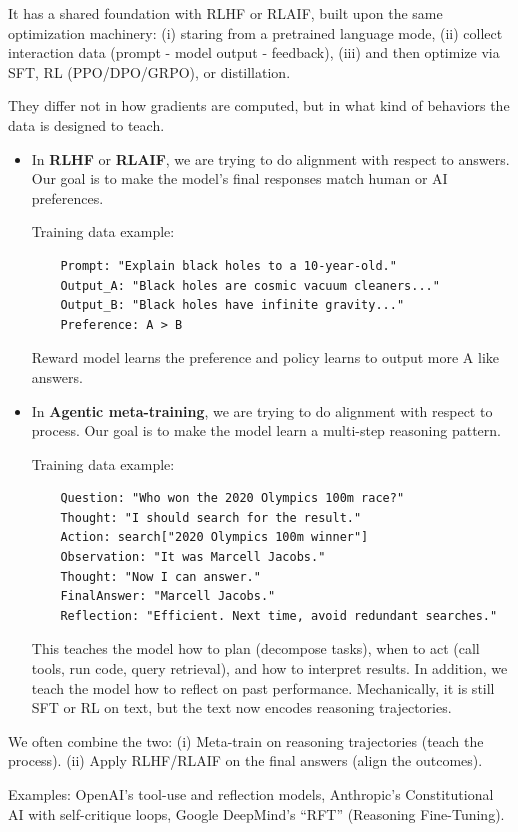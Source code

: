 \documentclass[11pt]{article}  %
\begin{document}
It has a shared foundation with RLHF or RLAIF, built upon the same optimization machinery: (i) staring from a pretrained language mode, (ii) collect interaction data (prompt - model output - feedback), (iii) and then optimize via SFT, RL (PPO/DPO/GRPO), or distillation.

They differ not in how gradients are computed, but in what kind of behaviors the data is designed to teach.

\begin{itemize}
  \item In \textbf{RLHF} or \textbf{RLAIF}, we are trying to do alignment with respect to answers.
  Our goal is to make the model's final responses match human or AI preferences.

  Training data example: 
  \begin{lstlisting}
    Prompt: "Explain black holes to a 10-year-old."
    Output_A: "Black holes are cosmic vacuum cleaners..."
    Output_B: "Black holes have infinite gravity..."
    Preference: A > B
  \end{lstlisting}

  Reward model learns the preference and policy learns to output more A like answers.

  \item In \textbf{Agentic meta-training}, we are trying to do alignment with respect to process.
  Our goal is to make the model learn a multi-step reasoning pattern.

  Training data example:
  \begin{lstlisting}
    Question: "Who won the 2020 Olympics 100m race?"
    Thought: "I should search for the result."
    Action: search["2020 Olympics 100m winner"]
    Observation: "It was Marcell Jacobs."
    Thought: "Now I can answer."
    FinalAnswer: "Marcell Jacobs."
    Reflection: "Efficient. Next time, avoid redundant searches."
  \end{lstlisting}
  This teaches the model how to plan (decompose tasks), when to act (call tools, run code, query retrieval), and how to interpret results. 
  In addition, we teach the model how to reflect on past performance.
  Mechanically, it is still SFT or RL on text, but the text now encodes reasoning trajectories.
\end{itemize}

We often combine the two: (i) Meta-train on reasoning trajectories (teach the process). (ii) Apply RLHF/RLAIF on the final answers (align the outcomes).

Examples: OpenAI's tool-use and reflection models, Anthropic's Constitutional AI with self-critique loops, Google DeepMind's ``RFT'' (Reasoning Fine-Tuning).
\end{document}
